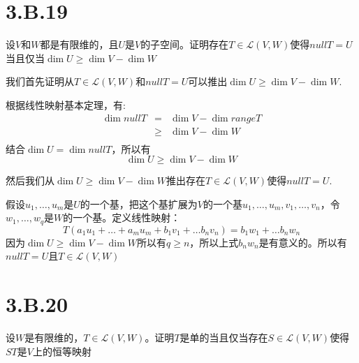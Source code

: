 \documentclass[10pt,a4paper,UTF8]{article}
\begin{document}
\section{3.B.19}
\label{sec:org1511951}


\begin{problem}
设\(V\)和\(W\)都是有限维的，且\(U\)是\(V\)的子空间。证明存在\(T\in \mathcal{L}(V,W)\)使得\(nullT = U\)当且仅当\(\dim U \geq \dim V -\dim W\)
\end{problem}

\begin{answer}
我们首先证明从\(T\in \mathcal{L}(V,W)\)和\(null T = U\)可以推出\(\dim U \geq \dim V -\dim W\).

根据线性映射基本定理，有:
\begin{eqnarray*}
\dim nullT&=&\dim V -\dim rangeT \\
&\geq& \dim V - \dim W \\
\end{eqnarray*}
结合\(\dim U  = \dim nullT\)，所以有\[\dim U \geq \dim V - \dim W\]

然后我们从\(\dim U \geq \dim V - \dim W\)推出存在\(T\in \mathcal{L}(V,W)\)使得\(nullT = U\).

假设\(u_{1},\ldots ,u_{m}\)是\(U\)的一个基，把这个基扩展为\(V\)的一个基\(u_{1},\ldots ,u_{m},v_{1},\ldots ,v_{n}\)，令\(w_{1},\ldots ,w_q\)是\(W\)的一个基。定义线性映射：
\begin{equation}
\label{eq:11}
T(a_{1}u_{1} + \ldots + a_{m}u_{m} + b_{1}v_{1} + \ldots b_{n}v_{n}) = b_{1}w_{1} + \ldots b_{n}w_{n}
\end{equation}
因为\(\dim U \geq \dim V - \dim W\)所以有\(q \geq n\)，所以上式\(b_{n}w_{n}\)是有意义的。所以有\(nullT = U\)且\(T\in \mathcal{L}(V,W)\)
\end{answer}


\section{3.B.20}
\label{sec:orgc13c992}


\begin{problem}
设\(W\)是有限维的，\(T\in \mathcal{L}(V,W)\)。证明\(T\)是单的当且仅当存在\(S\in \mathcal{L}(V,W)\)使得\(ST\)是\(V\)上的恒等映射
\end{problem}
\end{document}
